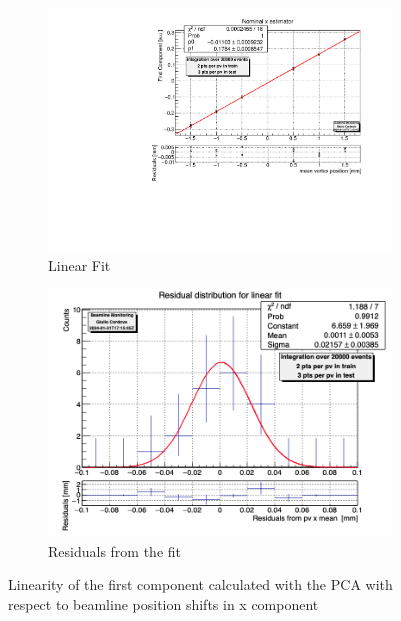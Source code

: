 \begin{figure}
    \centering
    \begin{subfigure}{0.48\textwidth}
    \includegraphics[width=\linewidth]{figures/x_fit.pdf}
    \caption{Linear Fit}\label{fig:xfit_MC}
    \end{subfigure}
    \begin{subfigure}{0.48\textwidth}
    \includegraphics[width=\linewidth]{figures/x_res.png}
    \caption{Residuals from the fit}\label{fig:xres_Mc}
    \end{subfigure}
    \caption{Linearity of the first component calculated with the PCA with respect to beamline position shifts in x component}
    \label{fig:x_MC}
\end{figure}


